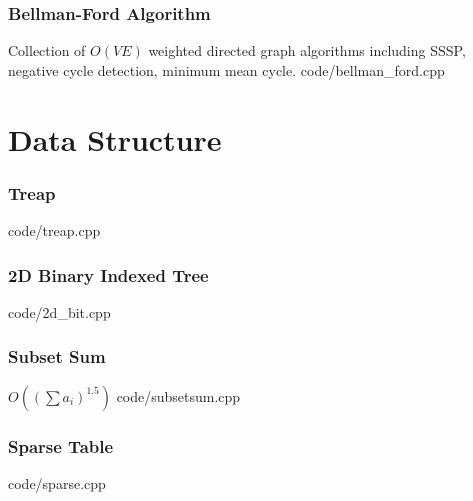 \documentclass [landscape,8pt,a4paper,twocolumn]{article}
\begin{document}
\section{Bellman-Ford Algorithm}
Collection of $ O(VE) $ weighted directed graph algorithms including SSSP, negative cycle detection, minimum mean cycle.
 {code/bellman_ford.cpp}

\newpage
\part{Data Structure}

\section{Treap}
 {code/treap.cpp}

\section{2D Binary Indexed Tree}
 {code/2d_bit.cpp}

\section{Subset Sum}
$ O((\sum a_i)^{1.5}) $
 {code/subsetsum.cpp}

\section{Sparse Table}
 {code/sparse.cpp}
\end{document}

